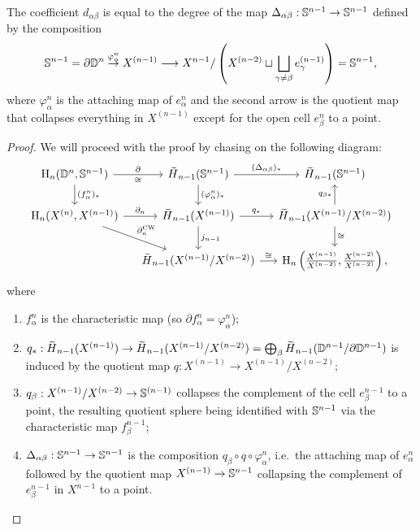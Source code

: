 \begin{thm}
    The coefficient $d_{\alpha\beta}$ is equal to the degree of the map $\Delta_{\alpha\beta}:\mathbb{S}^{n-1}\to \mathbb{S}^{n-1}$ defined by the composition
    \[\mathbb{S}^{n-1}=\partial \mathbb{D}^n\overset{\varphi_\alpha^n}{\to}X^{(n-1)}\longrightarrow X^{n-1}\slash\left(X^{(n-2)}\sqcup \bigsqcup_{\gamma\neq\beta}e_\gamma^{(n-1)}\right)=\mathbb{S}^{n-1},\]
    where $\varphi_\alpha^n$ is the attaching map of $e^n_\alpha$ and the second arrow is the quotient map that collapses everything in $X^{(n-1)}$ except for the open cell $e^n_\beta$ to a point.
\end{thm}
\begin{proof}
    We will proceed with the proof by chasing on the following diagram:
    \[
    \begin{tikzcd}[column sep=small] 
    \rmH_n(\bbD^n,\bbS^{n-1})\arrow[r,"\partial","\cong"']\arrow[d,"(f^n_\alpha)_\ast"]& \wt{H}_{n-1}(\bbS^{n-1})\arrow[r,"(\Delta_{\alpha\beta})_\ast"]\arrow[d,"(\varphi^n_\alpha)_\ast"]& \wt{H}_{n-1}(\bbS^{n-1})\\
    \rmH_n(X^{(n)},X^{(n-1)})\arrow[r,"\partial_n"]\arrow[dr,"\partial_n^{\mathrm{CW}}"]& \wt{H}_{n-1}(X^{(n-1)})\arrow[r,"q_\ast"]\arrow[d,"j_{n-1}"]&\wt{H}_{n-1}(X^{(n-1)}\slash X^{(n-2)})\arrow[d,"\cong"]\arrow[u,"q_{\beta\ast}"]\\
    & \wt{H}_{n-1}(X^{(n-1)}\slash X^{(n-2)})\arrow[r,"\cong"]& \rmH_n\left(\frac{X^{(n-1)}}{X^{(n-2)}},\frac{X^{(n-2)}}{X^{(n-2)}}\right),
    \end{tikzcd}
    \]
    where 
    \begin{enumerate}
         \item $f_\alpha^n$ is the characteristic map (so $\partial f_\alpha^n=\varphi_\alpha^n$); 
         \item $q_\ast:\wt{H}_{n-1}(X^{(n-1)})\to \wt{H}_{n-1}(X^{(n-1)}\slash X^{(n-2)})=\bigoplus_\beta \wt{H}_{n-1}(\bbD^{n-1}\slash \partial \bbD^{n-1})$ is induced by the quotient map $q:X^{(n-1)}\to X^{(n-1)}\slash X^{(n-2)}$; 
         \item $q_\beta:X^{(n-1)}\slash X^{(n-2)}\to \mathbb{S}^{(n-1)}$ collapses the complement of the cell $e^{n-1}_\beta$ to a point, the resulting quotient sphere being identified with $\mathbb{S}^{n-1}$ via the characteristic map $f^{n-1}_\beta$;
         \item $\Delta_{\alpha\beta}:\mathbb{S}^{n-1}\to \mathbb{S}^{n-1}$ is the composition $q_\beta\circ q\circ \varphi^n_\alpha$, i.e.~the attaching map of $e^n_\alpha$ followed by the quotient map $X^{(n-1)}\to \mathbb{S}^{n-1}$ collapsing the complement of $e^{n-1}_\beta$ in $X^{n-1}$ to a point.

\end{enumerate}
\end{proof}
